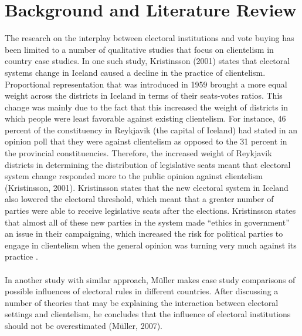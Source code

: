 \documentclass{article}
\begin{document}
\section{Background and Literature Review}
The research on the interplay between electoral institutions and vote buying has been limited to a number of qualitative studies that focus on clientelism in country case studies. In one such study, Kristinsson (2001) states that electoral systems change in Iceland caused a decline in the practice of clientelism. Proportional representation that was introduced in 1959 brought a more equal weight across the districts in Iceland in terms of their seats-votes ratios. This change was mainly due to the fact that this increased the weight of districts in which people were least favorable against existing clientelism. For instance, 46 percent of the constituency in Reykjavik (the capital of Iceland) had stated in an opinion poll that they were against clientelism as opposed to the 31 percent in the provincial constituencies. Therefore, the increased weight of Reykjavik districts in determining the distribution of legislative seats meant that electoral system change responded more to the public opinion against clientelism (Kristinsson, 2001). Kristinsson states that the new electoral system in Iceland also lowered the electoral threshold, which meant that a greater number of parties were able to receive legislative seats after the elections. Kristinsson states that almost all of these new parties in the system made ``ethics in government'' an issue in their campaigning, which increased the risk for political parties to engage in clientelism when the general opinion was turning very much against its practice \cite{kristinsson2001clientelism}.\\
\\
In another study with similar approach, M\"uller makes case study comparisons of possible influences of electoral rules in different countries. After discussing a number of theories that may be explaining the interaction between electoral settings and clientelism, he concludes that the influence of electoral institutions should not be overestimated (M\"uller, 2007).\\
\\
\end{document}
